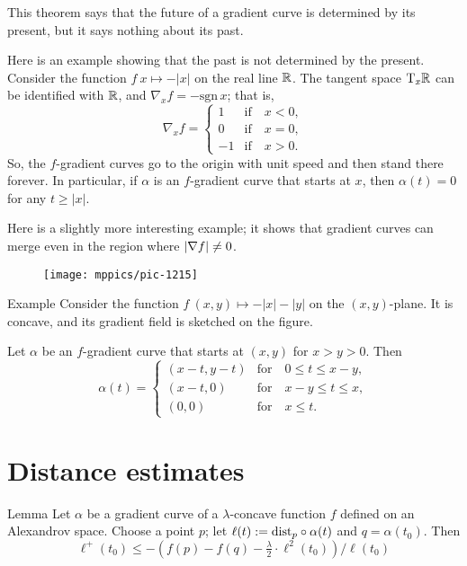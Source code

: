 This theorem says that the future of a gradient curve is determined by its present, but it says nothing about its past.

Here is an example showing that the past is not determined by the present.
Consider the function $f\:x\mapsto -|x|$ on the real line $\mathbb{R}$.
The tangent space $\mathrm{T}_x\mathbb{R}$ can be identified with $\mathbb{R}$, and $\nabla_xf=-\mathrm{sgn}\, x$; that is,
\[\nabla_xf=
\begin{cases}
1&\text{if}\quad x<0,
\\
0&\text{if}\quad x=0,
\\
-1&\text{if}\quad x>0.
\end{cases}
\]
So, the $f$-gradient curves go to the origin with unit speed and then stand there forever.
In particular, if $\alpha$ is an $f$-gradient curve that starts at $x$,
then $\alpha(t)=0$ for any $t\ge |x|$.

Here is a slightly more interesting example;
it shows that gradient curves can merge even in the region where $|\nabla f|\ne 0$. 


\begin{wrapfigure}[8]{r}{34 mm}
\vskip-0mm
\centering
\texttt{[image: mppics/pic-1215]}
\vskip0mm
\end{wrapfigure}

\begin{thm}{Example}
Consider the function $f\:(x,y)\mapsto-|x|-|y|$ on the $(x,y)$-plane.
It is concave, and its gradient field is sketched on the figure.

Let $\alpha$ be an $f$-gradient curve that starts at $(x,y)$ for $x>y>0$.
Then 
\[\alpha(t)=
\begin{cases}
(x-t,y-t) &\text{for}\quad 0\le t\le  x-y,
\\
(x-t,0) &\text{for}\quad x-y\le t\le  x,
\\
(0,0) &\text{for}\quad x\le t.
\end{cases}
\]

\end{thm}


\section{Distance estimates}

\begin{thm}{Lemma}\label{eq:fist-var-inq+}
Let $\alpha$ be a gradient curve of a $\lambda$-concave function $f$
defined on an Alexandrov space.
Choose a point $p$; let $\ell(t)\mathrel{:=}\mathrm{dist}_p\circ\alpha(t)$ and $q=\alpha(t_0)$.
Then 
\[
\ell^+(t_0)\le -\left({f(p)}-{f(q)}-\tfrac\lambda2\cdot\ell^2(t_0)\right)/\ell(t_0)
\]
\end{thm}

